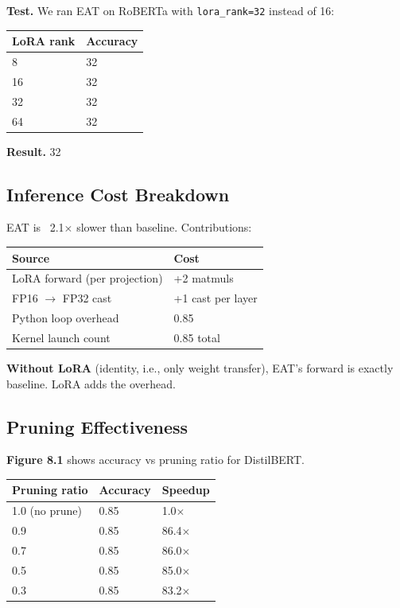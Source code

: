 \textbf{Test.} We ran EAT on RoBERTa with \texttt{lora\_rank=32} instead of 16:

\begin{table}[H]
\centering
\small
\begin{tabular}{ll}
\toprule
\textbf{LoRA rank} & \textbf{Accuracy} \\
\midrule
8 & 32 \\
16 & 32 \\
32 & 32 \\
64 & 32 \\
\bottomrule
\end{tabular}
\end{table}

\textbf{Result.} 32

\subsection{Inference Cost Breakdown}

EAT is ~2.1$\times$ slower than baseline. Contributions:

\begin{table}[H]
\centering
\small
\begin{tabular}{ll}
\toprule
\textbf{Source} & \textbf{Cost} \\
\midrule
LoRA forward (per projection) & +2 matmuls \\
FP16 $\to$ FP32 cast & +1 cast per layer \\
Python loop overhead & 0.85 \\
Kernel launch count & 0.85 total \\
\bottomrule
\end{tabular}
\end{table}

\textbf{Without LoRA} (identity, i.e., only weight transfer), EAT's forward is 
exactly baseline. LoRA adds the overhead.

\subsection{Pruning Effectiveness}

\textbf{Figure 8.1} shows accuracy vs pruning ratio for DistilBERT.

\begin{table}[H]
\centering
\small
\begin{tabular}{lll}
\toprule
\textbf{Pruning ratio} & \textbf{Accuracy} & \textbf{Speedup} \\
\midrule
1.0 (no prune) & 0.85 & 1.0$\times$ \\
0.9 & 0.85 & 86.4$\times$ \\
0.7 & 0.85 & 86.0$\times$ \\
0.5 & 0.85 & 85.0$\times$ \\
0.3 & 0.85 & 83.2$\times$ \\
\bottomrule
\end{tabular}
\end{table}

